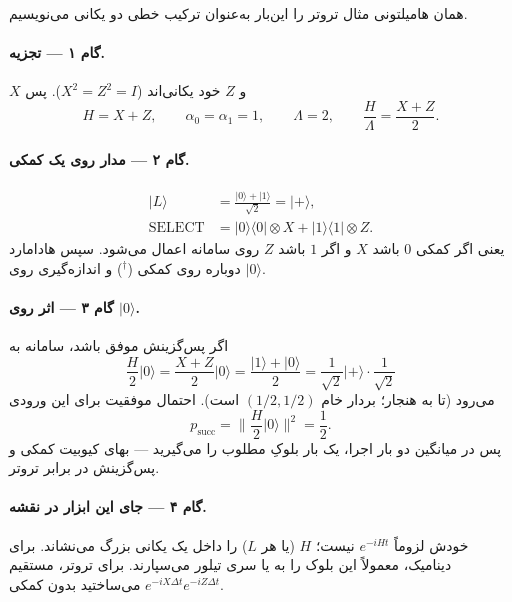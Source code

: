 همان هامیلتونی مثال تروتر را این‌بار به‌عنوان ترکیب خطی دو یکانی می‌نویسیم.

\paragraph{گام ۱ --- تجزیه.}
$X$ و $Z$ خود یکانی‌اند ($X^2=Z^2=I$). پس
\begin{equation}
	H=X+Z,
	\qquad
	\alpha_0=\alpha_1=1,
	\qquad
	\Lambda=2,
	\qquad
	\frac{H}{\Lambda}=\frac{X+Z}{2}.
\end{equation}

\paragraph{گام ۲ --- مدار روی یک کمکی.}
\begin{align}
	\lvert L\rangle
	&=
	\frac{\lvert0\rangle+\lvert1\rangle}{\sqrt{2}}=\lvert+\rangle,
	\\
	\mathrm{SELECT}
	&=
	\lvert0\rangle\langle0\rvert\otimes X
	+
	\lvert1\rangle\langle1\rvert\otimes Z.
\end{align}
یعنی اگر کمکی $0$ باشد $X$ و اگر $1$ باشد $Z$ روی سامانه اعمال می‌شود. سپس هادامارد دوباره روی کمکی ($^\dagger$) و اندازه‌گیری روی $\lvert0\rangle$.

\paragraph{گام ۳ --- اثر روی $\lvert0\rangle$.}
اگر پس‌گزینش موفق باشد، سامانه به
\begin{equation}
	\frac{H}{2}\lvert0\rangle
	=
	\frac{X+Z}{2}\lvert0\rangle
	=
	\frac{\lvert1\rangle+\lvert0\rangle}{2}
	=
	\frac{1}{\sqrt{2}}\lvert+\rangle
	\cdot \frac{1}{\sqrt{2}}
\end{equation}
می‌رود (تا به هنجار؛ بردار خام $(1/2,1/2)$ است). احتمال موفقیت برای این ورودی
\begin{equation}
	p_{\mathrm{succ}}
	=
	\biggl\lVert\frac{H}{2}\lvert0\rangle\biggr\rVert^2
	=
	\frac12.
\end{equation}
پس در میانگین دو بار اجرا، یک بار بلوکِ مطلوب را می‌گیرید --- بهای کیوبیت کمکی و پس‌گزینش در برابر تروتر.

\paragraph{گام ۴ --- جای این ابزار در نقشه.}
 خودش لزوماً $e^{-iHt}$ نیست؛ $H$ (یا هر $L$) را داخل یک یکانی بزرگ می‌نشاند. برای دینامیک، معمولاً این بلوک را به  یا سری تیلور می‌سپارند. برای تروتر، مستقیم $e^{-iX\Delta t}e^{-iZ\Delta t}$ می‌ساختید بدون کمکی.

